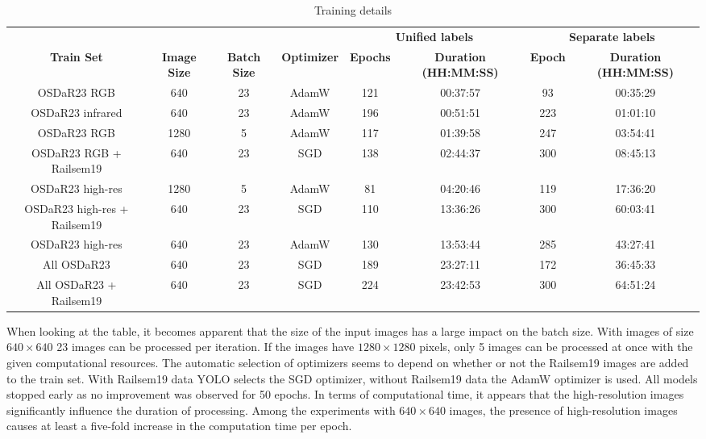 \documentclass[Master,MDS,english]{BASE/twbook} %
\begin{document}
\begin{table}[htbp]
    \centering
    \tiny
    \begin{tabular}{|c|c|c|c|c|c|c|c|}
    \hline
    &  &  & & \multicolumn{2}{c|}{\textbf{Unified labels}}   & \multicolumn{2}{c|}{\textbf{Separate labels}}   \\ \cline{5-8}
    \textbf{Train Set} & \textbf{Image Size} & \textbf{Batch Size} & \textbf{Optimizer} & \textbf{Epochs} & \textbf{Duration (HH:MM:SS)} & \textbf{Epoch} & \textbf{Duration (HH:MM:SS)} \\
    \hline
    OSDaR23 RGB & 640 & 23 & AdamW & 121 & 00:37:57 & 93 & 00:35:29 \\
    OSDaR23 infrared & 640 & 23 & AdamW & 196 & 00:51:51 & 223 & 01:01:10 \\
    OSDaR23 RGB & 1280 & 5 & AdamW & 117 & 01:39:58 & 247 & 03:54:41 \\
    OSDaR23 RGB + Railsem19 & 640 & 23 & SGD & 138 & 02:44:37 & 300 & 08:45:13 \\
    OSDaR23 high-res & 1280 & 5 & AdamW & 81 & 04:20:46 & 119 & 17:36:20 \\
    OSDaR23 high-res + Railsem19 & 640 & 23 & SGD & 110 & 13:36:26 & 300 & 60:03:41 \\
    OSDaR23 high-res & 640 & 23 & AdamW & 130 & 13:53:44 & 285 & 43:27:41 \\
    All OSDaR23 & 640 & 23 & SGD & 189 & 23:27:11 & 172 & 36:45:33 \\
    All OSDaR23 + Railsem19 & 640 & 23 & SGD & 224 & 23:42:53 & 300 & 64:51:24 \\
    \hline
    \end{tabular}
    \caption{Training details}
    \label{tab:training}
\end{table}
 
When looking at the table, it becomes apparent that the size of the input images has a large impact on the batch size. With images of size $640\times640$ 23 images can be processed per iteration. If the images have $1280\times1280$ pixels, only 5 images can be processed at once with the given computational resources. The automatic selection of optimizers seems to depend on whether or not the Railsem19 images are added to the train set. With Railsem19 data YOLO selects the SGD optimizer, without Railsem19 data the AdamW optimizer is used.   All models stopped early as no improvement was observed for 50 epochs. 
In terms of computational time, it appears that the high-resolution images significantly influence the duration of processing. Among the experiments with $640\times640$ images, the presence of high-resolution images causes at least a five-fold increase in the computation time per epoch.
\end{document}
